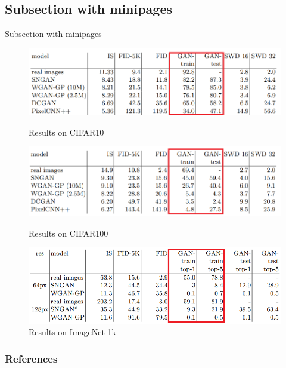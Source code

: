 \documentclass[english, xcolor=dvipsnames, aspectratio=169]{beamer}
\newcommand{\customToC}[2]
{
    \begin{frame}{Overview}
    \tableofcontents[#1,#2]
    \end{frame}
}
\newcommand{\subsectiontitle}{}
\begin{document}
\renewcommand{\subsectiontitle}{Subsection with minipages}
\subsection{\subsectiontitle}

\begin{frame}{\subsectiontitle}
    \begin{figure}[ht]
        \begin{minipage}[b]{0.45\linewidth}
            \centering
            \includegraphics[width=\textwidth]{cifar10.png}
            \caption{Results on CIFAR10}
            \label{fig:cifar10}
        \end{minipage}
        \hspace{0.5cm}
        \begin{minipage}[b]{0.45\linewidth}
            \centering
            \includegraphics[width=\textwidth]{cifar100.png}
            \caption{Results on CIFAR100}
            \label{fig:cifar100}
        \end{minipage}
        \begin{minipage}[b]{0.45\linewidth}
            \centering
            \includegraphics[width=\textwidth]{imagenet1k.png}
            \caption{Results on ImageNet 1k}
            \label{fig:imagenet1k}
        \end{minipage}
    \end{figure}
\end{frame}

\begin{frame}[t, allowframebreaks]
\frametitle{References}

\end{frame}
\end{document}
